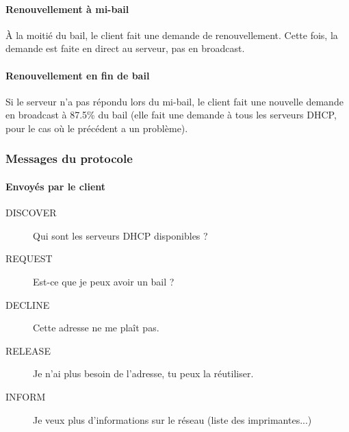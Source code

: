 \documentclass[10pt,a4paper,french]{article}
\begin{document}
\paragraph{Renouvellement à mi-bail}

À la moitié du bail, le client fait une demande de renouvellement. Cette fois, la demande est faite en direct au serveur, pas en broadcast.

\begin{center}
\begin{sequencediagram}
	
\end{sequencediagram}
\end{center}

\paragraph{Renouvellement en fin de bail}

Si le serveur n'a pas répondu lors du mi-bail, le client fait une nouvelle demande en broadcast à 87.5\% du bail (elle fait une demande à tous les serveurs DHCP, pour le cas où le précédent a un problème).

\begin{center}
\begin{sequencediagram}
	
\end{sequencediagram}
\end{center}

\subsubsection{Messages du protocole}

\paragraph{Envoyés par le client}

\begin{description}
\item[DISCOVER] Qui sont les serveurs DHCP disponibles ?
\item[REQUEST] Est-ce que je peux avoir un bail ?
\item[DECLINE] Cette adresse ne me plaît pas.
\item[RELEASE] Je n'ai plus besoin de l'adresse, tu peux la réutiliser.
\item[INFORM] Je veux plus d'informations sur le réseau (liste des imprimantes...)
\end{description}
\end{document}
